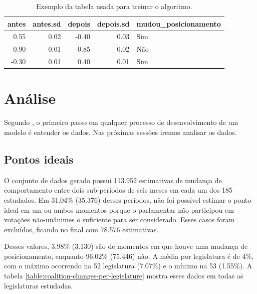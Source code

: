 \documentclass[a4paper,titlepage]{ppgi}\usepackage[]{graphicx}\usepackage[]{color}
\newenvironment{knitrout}{}{} %
\begin{document}
\begin{table}
\centering
\begin{knitrout}
\color{fgcolor}
\begin{tabular}{r|r|r|r|l}
\hline
antes & antes.sd & depois & depois.sd & mudou\_posicionamento\\
\hline
0.55 & 0.02 & -0.40 & 0.03 & Sim\\
\hline
0.90 & 0.01 & 0.85 & 0.02 & Não\\
\hline
-0.30 & 0.01 & 0.40 & 0.01 & Sim\\
\hline
\end{tabular}


\end{knitrout}
\caption{Exemplo da tabela usada para treinar o algoritmo.}
\label{table:dataset-final}
\end{table}


\section{Análise}
\label{sec:miolo:analise}

Segundo , o primeiro passo em qualquer processo de
desenvolvimento de um modelo é entender os dados. Nas próximas sessões iremos
analisar os dados.

\subsection{Pontos ideais}



O conjunto de dados gerado possui 113.952 estimativas de mudança
de comportamento entre dois sub-períodos de seis meses em cada um dos
185 estudados. Em 31.04\% (35.376) desses períodos, não foi possível
estimar o ponto ideal em um ou ambos momentos porque o parlamentar não
participou em votações não-unânimes o suficiente para ser considerado. Esses
casos foram excluídos, ficando no final com 78.576 estimativas.

Desses valores, 3.98\%
(3.130) são de momentos em que houve uma mudança de
posicionamento, enquanto 96.02\% (75.446) não. A média por legislatura é de
4\%, com o
máximo ocorrendo na 52\textordfeminine{} legislatura
(7.07\%) e o
mínimo na 53\textordfeminine{}
(1.55\%).
A tabela \ref{table:coalition-changes-per-legislature} mostra esses dados em
todas as legislaturas estudadas.
\end{document}
